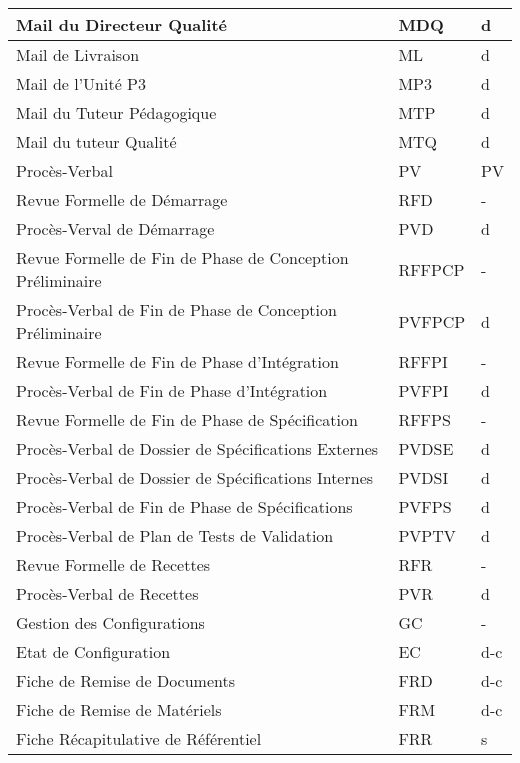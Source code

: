 \begin{table}[H]
\begin{tabularx}{16cm}{|X|p{2.5cm}|p{2cm}|}
    \hline
          Mail du Directeur Qualité & MDQ & d\\
    \hline
          Mail de Livraison & ML & d\\
    \hline
          Mail de l'Unité P3 & MP3 & d\\
    \hline
          Mail du Tuteur Pédagogique & MTP & d\\
    \hline
          Mail du tuteur Qualité & MTQ & d\\
    \hline
       Procès-Verbal & PV & PV\\
    \hline
          Revue Formelle de Démarrage & RFD & -\\
    \hline
             Procès-Verval de Démarrage & PVD & d\\
    \hline
          Revue Formelle de Fin de Phase de Conception Préliminaire & RFFPCP & -\\
    \hline
             Procès-Verbal de Fin de Phase de Conception Préliminaire & PVFPCP & d\\
    \hline
          Revue Formelle de Fin de Phase d'Intégration & RFFPI & -\\
    \hline
             Procès-Verbal de Fin de Phase d'Intégration & PVFPI & d\\
    \hline
          Revue Formelle de Fin de Phase de Spécification & RFFPS & -\\
    \hline
             Procès-Verbal de Dossier de Spécifications Externes & PVDSE & d\\
    \hline
             Procès-Verbal de Dossier de Spécifications Internes & PVDSI & d\\
    \hline
             Procès-Verbal de Fin de Phase de Spécifications & PVFPS & d\\
    \hline
             Procès-Verbal de Plan de Tests de Validation & PVPTV & d\\
    \hline
          Revue Formelle de Recettes & RFR & -\\
    \hline
             Procès-Verbal de Recettes & PVR & d\\
    \hline
    Gestion des Configurations & GC & -\\
    \hline
       Etat de Configuration & EC & d-c\\
    \hline
       Fiche de Remise de Documents & FRD & d-c\\
    \hline
       Fiche de Remise de Matériels & FRM & d-c\\
    \hline
       Fiche Récapitulative de Référentiel & FRR & s\\

\end{tabularx}
\end{table}
